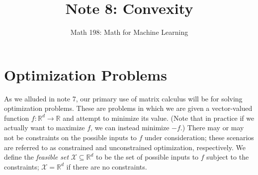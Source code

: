 \documentclass{article}
\title{Note 8: Convexity}
\author{Math 198: Math for Machine Learning}
\date{}
\begin{document}
\maketitle

\section{Optimization Problems}
As we alluded in note 7, our primary use of matrix calculus will be for solving optimization problems. These are problems in which we are given a vector-valued function $f: \mathbb{R}^d \rightarrow \mathbb{R}$ and attempt to minimize its value. (Note that in practice if we actually want to maximize $f$, we can instead minimize $-f$.) There may or may not be constraints on the possible inputs to $f$ under consideration; these scenarios are referred to as constrained and unconstrained optimization, respectively. We define the \textit{feasible set} $\mathcal{X} \subseteq \mathbb{R}^d$ to be the set of possible inputs to $f$ subject to the constraints; $\mathcal{X} = \mathbb{R}^d$ if there are no constraints.
\end{document}
